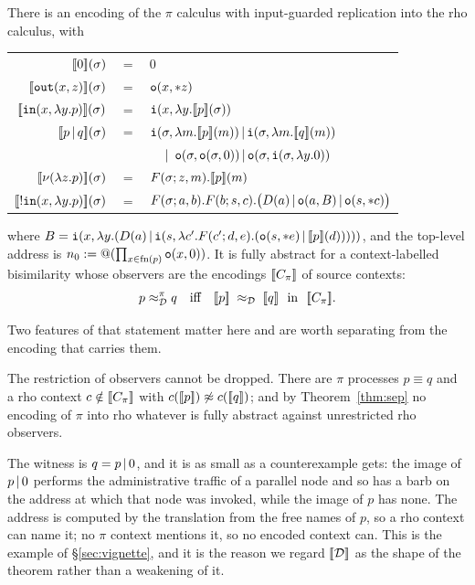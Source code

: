 \documentclass{article}
\begin{document}
\begin{theorem}
\label{thm:nowns}
    There is an encoding of the $\pi$ calculus with input-guarded replication into the rho calculus, with
    \begin{center}
        \renewcommand{\arraystretch}{1.25}
        \begin{tabular}{rcl}
             $[\![0]\!](\sigma)$ & $=$ & $0$\\
             $[\![\mathtt{out}(x,z)]\!](\sigma)$ & $=$ & $\mathtt{o}(x,\ast z)$\\
             $[\![\mathtt{in}(x,\lambda y.p)]\!](\sigma)$ & $=$ & $\mathtt{i}(x,\lambda y.[\![p]\!](\sigma))$\\
             $[\![p\,|\, q]\!](\sigma)$ & $=$ & $\mathtt{i}(\sigma,\lambda m.[\![p]\!](m))\,|\, \mathtt{i}(\sigma,\lambda m.[\![q]\!](m))$\\
             && $\quad\pr\ \mtt{o}(\sigma,\mtt{o}(\sigma,0))\pr \mtt{o}(\sigma,\mtt{i}(\sigma,\lambda y.0))$\\
             $[\![\nu(\lambda z.p)]\!](\sigma)$ & $=$ & $F(\sigma;z,m).[\![p]\!](m)$\\
             $[\![!\mathtt{in}(x,\lambda y.p)]\!](\sigma)$ & $=$ & $F(\sigma;a,b).F(b;s,c).\big(D(a)\,|\,\mathtt{o}(a,B)\,|\,\mathtt{o}(s,\ast c)\big)$
        \end{tabular}
    \end{center}
    where $B=\mathtt{i}(x,\lambda y.(D(a)\,|\, \mathtt{i}(s,\lambda c'.F(c';d,e).(\mathtt{o}(s,\ast e)\,|\,[\![p]\!](d)))))$, and the top-level address is $n_0:=@(\prod_{x\in\mathrm{fn}(p)}\mathtt{o}(x,0))$. It is fully abstract for a context-labelled bisimilarity whose observers are the encodings $[\![C_\pi]\!]$ of source contexts:
    \[p\Dbis^{\pi} q\quad\text{iff}\quad \map{p}\;\Dbis\;\map{q}\ \text{ in }\ \map{C_\pi}.\]
\end{theorem}

Two features of that statement matter here and are worth separating from the encoding that carries them.

\begin{proposition}
\label{prop:forced}
    The restriction of observers cannot be dropped. There are $\pi$ processes $p\equiv q$ and a rho context $c\notin [\![C_\pi]\!]$ with $c([\![p]\!])\not\approx c([\![q]\!])$; and by Theorem~\ref{thm:sep} no encoding of $\pi$ into rho whatever is fully abstract against unrestricted rho observers.
\end{proposition}

The witness is $q=p\,|\, 0$, and it is as small as a counterexample gets: the image of $p\,|\, 0$ performs the administrative traffic of a parallel node and so has a barb on the address at which that node was invoked, while the image of $p$ has none. The address is computed by the translation from the free names of $p$, so a rho context can name it; no $\pi$ context mentions it, so no encoded context can. This is the example of \S\ref{sec:vignette}, and it is the reason we regard $[\![\mathcal{D}]\!]$ as the shape of the theorem rather than a weakening of it.
\end{document}
